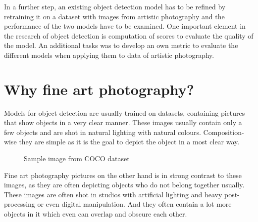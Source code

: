 In a further step, an existing object detection model has to be refined by retraining it on a dataset with images from artistic photography and the performance of the two models have to be examined.
One important element in the research of object detection is computation of scores to evaluate the quality of the model. An additional tasks was to develop an own metric to evaluate the different models when applying them to data of artistic photography.

\section{Why fine art photography?}
Models for object detection are usually trained on datasets, containing pictures that show objects in a very clear manner. These images usually contain only a few objects and are shot in natural lighting with natural colours. Composition-wise they are simple as it is the goal to depict the object in a most clear way.

\begin{figure}[H]
	\caption{\label{fig:coco-sample} Sample image from COCO dataset}
\end{figure}

Fine art photography pictures on the other hand is in strong contrast to these images, as they are often depicting objects who do not belong together usually. These images are often shot in studios with artificial lighting and heavy post-processing or even digital manipulation. And they often contain a lot more objects in it which even can overlap and obscure each other.


